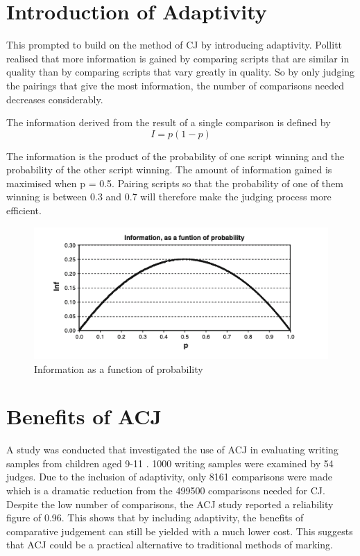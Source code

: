 \documentclass{l4proj}
\begin{document}
\section{Introduction of Adaptivity}
This prompted \citet{pollitt2012comparative} to build on the method of CJ by introducing adaptivity. Pollitt realised that more information is gained by comparing scripts that are similar in quality than by comparing scripts that vary greatly in quality. So by only judging the pairings that give the most information, the number of comparisons needed decreases considerably.

The information derived from the result of a single comparison is defined by 
\[I = p(1-p)\]  

The information is the product of the probability of one script winning and the probability of the other script winning. The amount of information gained is maximised when p = 0.5. Pairing scripts so that the probability of one of them winning is between 0.3 and 0.7 will therefore make the judging process more efficient.

\begin{figure}[h]
\begin{center}
    \includegraphics[width=0.65\linewidth]{images/info-pollitt.png}    
    \caption{Information as a function of probability \citep{pollitt2012comparative}}
\end{center}
\end{figure}

\section{Benefits of ACJ}
A study was conducted that investigated the use of ACJ in evaluating writing samples from children aged 9-11 \citep{pollitt2012method}. 1000 writing samples were examined by 54 judges. Due to the inclusion of adaptivity, only 8161 comparisons were made which is a dramatic reduction from the 499500 comparisons needed for CJ. Despite the low number of comparisons, the ACJ study reported a reliability figure of 0.96. This shows that by including adaptivity, the benefits of comparative judgement can still be yielded with a much lower cost. This suggests that ACJ could be a practical alternative to traditional methods of marking.
\end{document}

